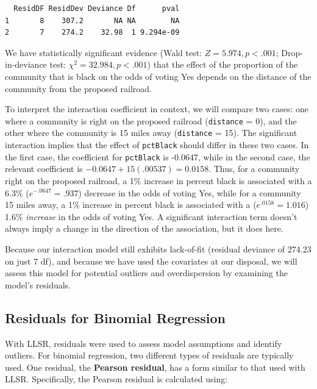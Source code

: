 \documentclass[
]{krantz}
\begin{document}
\begin{verbatim}
  ResidDF ResidDev Deviance Df      pval
1       8    307.2       NA NA        NA
2       7    274.2    32.98  1 9.294e-09
\end{verbatim}

We have statistically significant evidence (Wald test: \(Z = 5.974, p<.001\); Drop-in-deviance test: \(\chi^2=32.984, p<.001\)) that the effect of the proportion of the community that is black on the odds of voting Yes depends on the distance of the community from the proposed railroad.

To interpret the interaction coefficient in context, we will compare two cases: one where a community is right on the proposed railroad (\texttt{distance} = 0), and the other where the community is 15 miles away (\texttt{distance} = 15). The significant interaction implies that the effect of \texttt{pctBlack} should differ in these two cases. In the first case, the coefficient for \texttt{pctBlack} is -0.0647, while in the second case, the relevant coefficient is \(-0.0647+15(.00537) = 0.0158\). Thus, for a community right on the proposed railroad, a 1\% increase in percent black is associated with a 6.3\% (\(e^{-.0647}=.937\)) decrease in the odds of voting Yes, while for a community 15 miles away, a 1\% increase in percent black is associated with a (\(e^{.0158}=1.016\)) 1.6\% \emph{increase} in the odds of voting Yes. A significant interaction term doesn't always imply a change in the direction of the association, but it does here.

Because our interaction model still exhibits lack-of-fit (residual deviance of 274.23 on just 7 df), and because we have used the covariates at our disposal, we will assess this model for potential outliers and overdispersion by examining the model's residuals.

\hypertarget{residuals-for-binomial-regression}{%
\subsection{Residuals for Binomial Regression}\label{residuals-for-binomial-regression}}

With LLSR, residuals were used to assess model assumptions and identify outliers. For binomial regression, two different types of residuals are typically used. One residual, the \textbf{Pearson residual},  has a form similar to that used with LLSR. Specifically, the Pearson residual is calculated using:
\end{document}
